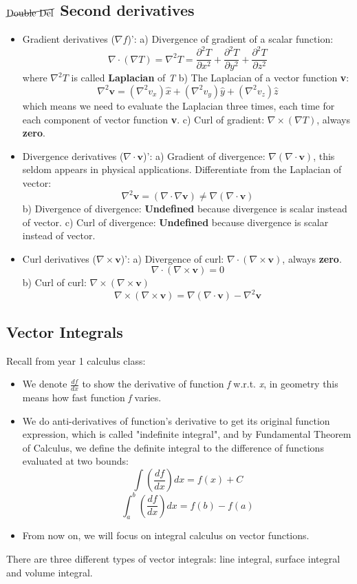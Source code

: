 \documentclass[12pt,a4paper,twoside]{article}
\numberwithin{equation}{section}
\begin{document}
	\subsection{$\cancel{\textrm{Double Del}}$ Second derivatives}
	\begin{itemize}
		\item Gradient derivatives (\(\nabla f\))':
		\subitem a) Divergence of gradient of a scalar function:
		\[\nabla \cdot (\nabla T)=\nabla^2T = \frac{\partial ^2T}{\partial x^2}+\frac{\partial^2 T}{\partial y^2}+\frac{\partial^2 T}{\partial z^2}\]
		where \(\nabla^2 T\) is called \textbf{Laplacian} of \textit{T}
		\subitem b) The Laplacian of a vector function \textbf{v}:
		\[\nabla^2\textbf{v}=(\nabla^2 v_x)\hat{x}+(\nabla^2 v_y)\hat{y}+(\nabla^2 v_z)\hat{z}\]
		which means we need to evaluate the Laplacian three times, each time for each component of vector function \textbf{v}.
		\subitem c) Curl of gradient: \(\nabla\times (\nabla T)\), always \textbf{zero}.
		\item Divergence derivatives (\(\nabla \cdot \textbf{v}\))':
		\subitem a) Gradient of divergence: \(\nabla(\nabla\cdot \textbf{v})\), this seldom appears in physical applications. Differentiate from the Laplacian of vector:
		\[\nabla^2 \textbf{v}=(\nabla \cdot \nabla \textbf{v})\neq\nabla(\nabla \cdot \textbf{v})\]
		\subitem b) Divergence of divergence: \textbf{Undefined} because divergence is scalar instead of vector.
		\subitem c) Curl of divergence: \textbf{Undefined} because divergence is scalar instead of vector.
		\item Curl derivatives (\(\nabla \times \textbf{v}\))':
		\subitem a) Divergence of curl: \(\nabla \cdot (\nabla \times \textbf{v})\), always \textbf{zero}.
		\[\nabla \cdot (\nabla \times \textbf{v})=0\]
		\subitem b) Curl of curl: \(\nabla \times(\nabla\times \textbf{v})\)
		\[\nabla \times(\nabla\times \textbf{v})=\nabla(\nabla \cdot \textbf{v})-\nabla^2\textbf{v}\]
	\end{itemize}
	
	
	\subsection{Vector Integrals}
	Recall from year 1 calculus class:
	\begin{itemize}
		\item We denote \(\frac{df}{dx}\) to show the derivative of function \textit{f} w.r.t. \textit{x}, in geometry this means how fast function \textit{f} varies.
		\item We do anti-derivatives of function's derivative to get its original function expression, which is called "indefinite integral", and by Fundamental Theorem of Calculus, we define the definite integral to the difference of functions evaluated at two bounds:
		\[\int \left(\frac{df}{dx}\right)dx=f(x)+C\]
		\[\int_{a}^{b}\left(\frac{df}{dx}\right)dx=f(b)-f(a)\]
		\item From now on, we will focus on integral calculus on vector functions.
	\end{itemize}
	There are three different types of vector integrals: line integral, surface integral and volume integral.
	
\end{document}
